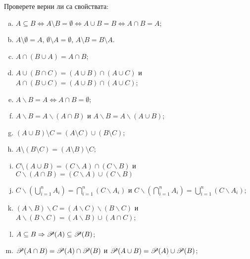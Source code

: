 

\begin{problem}
  Проверете верни ли са свойствата:
  \begin{enumerate}[a)]
  \item
    $A\subseteq B \iff A\setminus B = \emptyset \iff A\cup B = B \iff A\cap B = A$;
  \item
    $A\setminus \emptyset = A$, $\emptyset\setminus A=\emptyset$, $A\setminus B = B\setminus A$.
  \item
    $A\cap (B\cup A) = A \cap B$;
  \item
    $A\cup(B\cap C) = (A\cup B)\cap(A\cup C)$ и $A \cap (B \cup C) = (A \cup B) \cap (A \cup C)$;
  \item
    $A\backslash B = A \iff A\cap B = \emptyset$;
  \item
    $A\backslash B = A\backslash (A\cap B)$ и $A\backslash B = A\backslash (A\cup B)$;
  \item
    $(A\cup B)\setminus C = (A\setminus C) \cup (B\setminus C)$;
  \item
    $A\setminus (B\setminus C) = (A\setminus B)\setminus C$;
  \item
    $C\setminus (A\cup B) = (C\backslash A)\cap(C\backslash B)$ и $C \backslash (A\cap B) = (C\backslash A)\cup(C\backslash B)$
  \item
    $C\backslash(\bigcup^{n}_{i=1} A_i) = \bigcap^{n}_{i=1} (C\backslash A_i)$ и $C \backslash(\bigcap^{n}_{i=1} A_i) = \bigcup^{n}_{i=1} (C\backslash A_i)$;
  \item
    $(A\backslash B)\backslash C = (A\backslash C)\backslash(B \backslash C)$ и $A\backslash (B\backslash C) = (A\backslash B) \cup (A\cap C)$;
  \item
    $A\subseteq B \Rightarrow \mathscr{P}(A) \subseteq \mathscr{P}(B)$;
  \item
    $\mathscr{P}(A\cap B) = \mathscr{P}(A) \cap \mathscr{P}(B)$ и $\mathscr{P}(A\cup B) = \mathscr{P}(A) \cup \mathscr{P}(B)$;
  \end{enumerate}
\end{problem}

